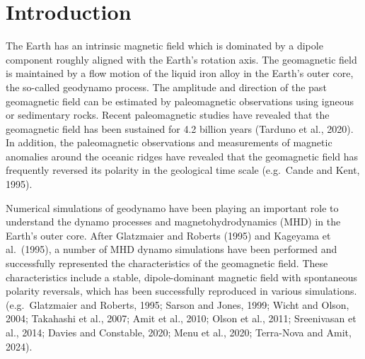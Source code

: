 \newpage
\section{Introduction}
\label{section:introduction}
The Earth has an intrinsic magnetic field which is dominated by a dipole component roughly aligned with the Earth's rotation axis. 
{\color{teal}
The geomagnetic field is maintained by a flow motion of the liquid iron alloy in the Earth's outer core, the so-called geodynamo process.
}
The amplitude and direction of the past geomagnetic field can be estimated by paleomagnetic observations using igneous or sedimentary rocks.
Recent paleomagnetic studies have revealed that the geomagnetic field has been sustained for 4.2 billion years (Tarduno et al., 2020). %
In addition, the paleomagnetic observations and measurements of magnetic anomalies around the oceanic ridges have revealed that 
{\color{teal}
the geomagnetic field has frequently reversed its polarity in the geological time scale (e.g.\ Cande and Kent, 1995).
}

Numerical simulations of geodynamo have been playing an important role to understand the dynamo processes and magnetohydrodynamics (MHD) in the Earth's outer core.
After Glatzmaier and Roberts (1995) %
and Kageyama et al.\ (1995), %
{\color{red} a number of MHD dynamo simulations have been performed and successfully represented the characteristics of the geomagnetic field}. 
{\color{magenta}
These characteristics include a stable, dipole-dominant magnetic field with spontaneous polarity reversals, which has been successfully reproduced in various simulations. (e.g.\ Glatzmaier and Roberts, 1995; 
}
Sarson and Jones, 1999;
{\color{teal}
Wicht and Olson, 2004;
}
Takahashi et al., 2007; 
{\color{red}
Amit et al., 2010; 
}
Olson et al., 2011; 
Sreenivasan et al., 2014;
{\color{red}
Davies and Constable, 2020;
Menu et al., 2020;
Terra-Nova and Amit, 2024).
}

